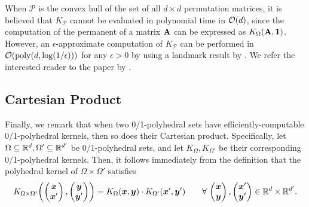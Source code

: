 When $\mathcal{P}$ is the convex hull of the set of all $d\times d$ permutation matrices, it is believed that $K_{\mathcal{P}}$ cannot be evaluated in polynomial time in $\mathcal{O}(d)$, since the computation of the permanent of a matrix $\mathbf{A}$ can be expressed as $K_\Omega(\mathbf{A}, \bm{1})$. However, an $\epsilon$-approximate computation of $K_{\mathcal{P}}$ can be performed in $\mathcal{O}(\operatorname{poly}(d,\log(1/\epsilon)))$ for any $\epsilon > 0$ by using a landmark result by \citet{jerrum2004polynomial}. We refer the interested reader to the paper by \citet[Section 5.3]{cesa2012combinatorial}.

\subsection{Cartesian Product}

Finally, we remark that when two 0/1-polyhedral sets have efficiently-computable 0/1-polyhedral kernels, then so does their Cartesian product. Specifically, let $\Omega\subseteq{\mathbb{R}}^d, \Omega'\subseteq{\mathbb{R}}^{d'}$ be 0/1-polyhedral sets, and let $K_\Omega, K_{\Omega'}$ be their corresponding 0/1-polyhedral kernels. Then, it follows immediately from the definition that the polyhedral kernel of $\Omega\times\Omega'$ satisfies
\newcommand{\vstack}[2]{\begin{pmatrix}#1\\#2\end{pmatrix}}
\[
    K_{\Omega\times\Omega'}\mleft(\vstack{\vx}{\vx'}, \vstack{\vy}{\vy'}\mright) = K_\Omega(\vx, \vy) \cdot K_{\Omega'}(\vx',\vy') \qquad\forall\,\vstack{\vx}{\vy}, \vstack{\vx'}{\vy'} \in \bbR^d\times\bbR^{d'}.
\]


